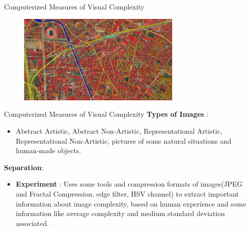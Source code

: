 \documentclass{beamer}
\begin{document}
\begin{frame}{Computerized Measures of Visual Complexity}

\begin{figure}
	\centering
	\includegraphics[width=0.7\textwidth]{Ex_Clutter.jpg}
\end{figure}

\end{frame}

 \begin{frame}{Computerized Measures of Visual Complexity}
    \textbf{Types of Images} : 
    \begin{itemize}
        \item Abstract Artistic, Abstract Non-Artistic, Representational Artistic, Representational Non-Artistic, pictures of some natural situations and human-made objects.
    \end{itemize}
    \textbf{Separation}:
    \begin{itemize}
        \item \textbf{Experiment} : Uses some tools and compression formats of images(JPEG and Fractal Compression, edge filter, HSV channel) to extract important information about image complexity, based on human experience and some information like average complexity and medium standard deviation associated.
    \end{itemize}
    
\end{frame}
\end{document}
